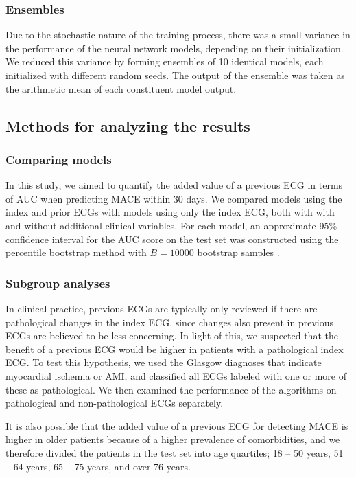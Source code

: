 \documentclass[preprint]{elsarticle}
\begin{document}
\subsubsection{Ensembles}
Due to the stochastic nature of the training process, there was a small variance in the performance of the neural network models, depending on their initialization. We reduced this variance by forming ensembles of 10 identical models, each initialized with different random seeds. The output of the ensemble was taken as the arithmetic mean of each constituent model output.

\subsection{Methods for analyzing the results}
\subsubsection{Comparing models}
In this study, we aimed to quantify the added value of a previous ECG in terms of AUC  when predicting MACE within 30 days. We compared models using the index and prior ECGs with models using only the index ECG, both with with and without additional clinical variables. For each model, an approximate 95\% confidence interval for the AUC score on the test set was constructed using the percentile bootstrap method with $B=10000$ bootstrap samples \citep{efron1981}.

\subsubsection{Subgroup analyses}
In clinical practice, previous ECGs are typically only reviewed if there are pathological changes in the index ECG, since changes also present in previous ECGs are believed to be less concerning. In light of this, we suspected that the benefit of a previous ECG would be higher in patients with a pathological index ECG. To test this hypothesis, we used the Glasgow diagnoses that indicate myocardial ischemia or AMI, and classified all ECGs labeled with one or more of these as pathological. We then examined the performance of the algorithms on pathological and non-pathological ECGs separately.

It is also possible that the added value of a previous ECG for detecting MACE is higher in older patients because of a higher prevalence of comorbidities, and we therefore divided the patients in the test set into age quartiles; 18 -- 50 years, 51 -- 64 years, 65 -- 75 years, and over 76 years.
\end{document}
